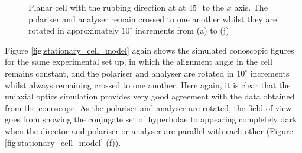 \begin{figure}
\begin{center}
\end{center}
\caption[Conoscopic images of a planar cell - rotating polarisers]{\label{fig:stationary_cell_data}Planar cell with the rubbing direction at at $45^\circ$ to the $x$ axis. The polariser and analyser remain crossed to one another whilst they are rotated in approximately $10^\circ$ increments from (a) to (j)}
\end{figure}

Figure \ref{fig:stationary_cell_model} again shows the simulated conoscopic figures for the same experimental set up, in which the alignment angle in the cell remains constant, and the polariser and analyser are rotated in $10^\circ$ increments whilst always remaining crossed to one another. Here again, it is clear that the uniaxial optics simulation provides very good agreement with the data obtained from the conoscope. As the polariser and analyser are rotated, the field of view goes from showing the conjugate set of hyperbolae to appearing completely dark when the director and polariser or analyser are parallel with each other (Figure \ref{fig:stationary_cell_model} (f)).

